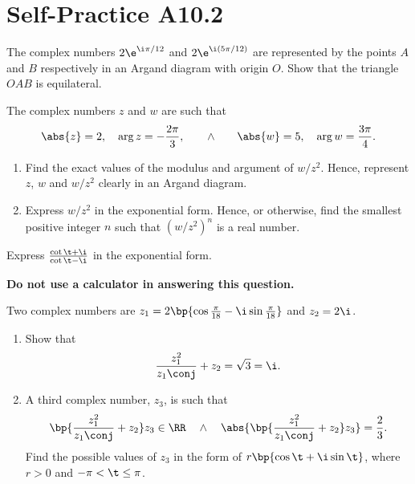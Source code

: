 \section{Self-Practice A10.2}

\begin{problem}
    The complex numbers $2\e^{\i \pi /12}$ and $2\e^{\i (5\pi/12)}$ are represented by the points $A$ and $B$ respectively in an Argand diagram with origin $O$. Show that the triangle $OAB$ is equilateral.
\end{problem}

\begin{problem}
    The complex numbers $z$ and $w$ are such that \[\abs{z} = 2, \quad \arg{z} = -\frac{2\pi}3, \qquad \land \qquad \abs{w} = 5, \quad \arg{w} = \frac{3\pi}4.\]

    \begin{enumerate}
        \item Find the exact values of the modulus and argument of $w/z^2$. Hence, represent $z$, $w$ and $w/z^2$ clearly in an Argand diagram.
        \item Express $w/z^2$ in the exponential form. Hence, or otherwise, find the smallest positive integer $n$ such that $(w/z^2)^n$ is a real number.
    \end{enumerate}
\end{problem}

\begin{problem}
    Express $\frac{\cot \t + \i}{\cot \t - \i}$ in the exponential form.
\end{problem}

\begin{problem}
    \textbf{Do not use a calculator in answering this question.}

    Two complex numbers are $z_1 = 2\bp{\cos \frac\pi{18} - \i \sin \frac\pi{18}}$ and $z_2 = 2\i$.

    \begin{enumerate}
        \item Show that \[\frac{z_1^2}{z_1\conj} + z_2 = \sqrt3 = \i.\]
        \item A third complex number, $z_3$, is such that \[\bp{\frac{z_1^2}{z_1\conj} + z_2} z_3 \in \RR \quad \land \quad \abs{\bp{\frac{z_1^2}{z_1\conj} + z_2} z_3} = \frac23.\] Find the possible values of $z_3$ in the form of $r\bp{\cos \t + \i \sin \t}$, where $r > 0$ and $-\pi < \t \leq \pi$.
    \end{enumerate}
\end{problem}

